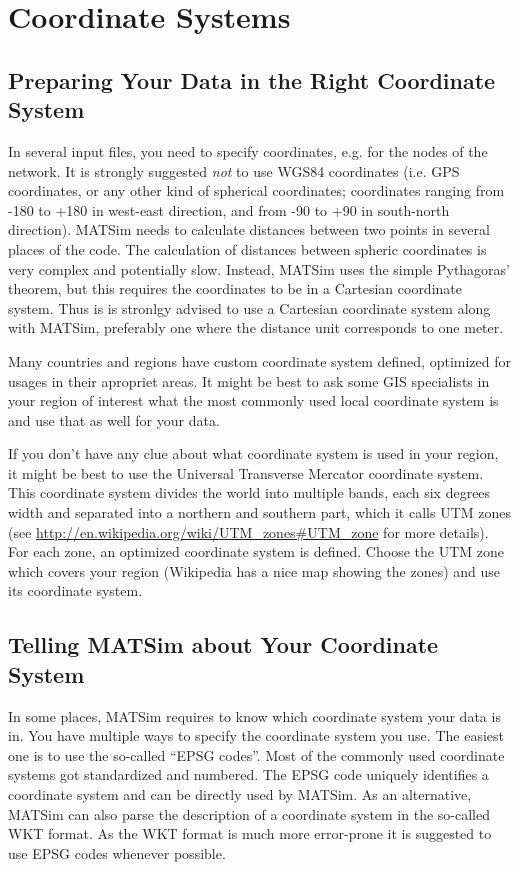 \section{Coordinate Systems}
\label{sec:BuildingScenarios:CoordinateSystems}

\subsection{Preparing Your Data in the Right Coordinate System}

In several input files, you need to specify coordinates, e.g. for the nodes of
the network. It is strongly suggested \emph{not} to use WGS84 coordinates (i.e.
GPS coordinates, or any other kind of spherical coordinates; coordinates ranging
from -180 to +180 in west-east direction, and from -90 to +90 in south-north
direction). MATSim needs to calculate distances between two points in several
places of the code. The calculation of distances between spheric coordinates is
very complex and potentially slow. Instead, MATSim uses the simple Pythagoras'
theorem, but this requires the coordinates to be in a Cartesian coordinate
system. Thus is is stronlgy advised to use a Cartesian coordinate system along
with MATSim, preferably one where the distance unit corresponds to one meter.

Many countries and regions have custom coordinate system defined, optimized for
usages in their apropriet areas. It might be best to ask some GIS specialists in
your region of interest what the most commonly used local coordinate system is
and use that as well for your data. 

If you don't have any clue about what coordinate system is used in your region,
it might be best to use the Universal Transverse Mercator coordinate system.
This coordinate system divides the world into multiple bands, each six degrees
width and separated into a northern and southern part, which it calls UTM zones
(see \url{http://en.wikipedia.org/wiki/UTM_zones#UTM_zone} for more details).
For each zone, an optimized coordinate system is defined. Choose the UTM zone
which covers your region (Wikipedia has a nice map showing the zones) and use
its coordinate system.

\subsection{Telling MATSim about Your Coordinate System}

In some places, MATSim requires to know which coordinate system your data is in.
You have multiple ways to specify the coordinate system you use. The easiest one
is to use the so-called ``EPSG codes''. Most of the commonly used coordinate
systems got standardized and numbered. The EPSG code uniquely identifies a
coordinate system and can be directly used by MATSim. As an alternative, MATSim
can also parse the description of a coordinate system in the so-called WKT
format. As the WKT format is much more error-prone it is suggested to use EPSG
codes whenever possible.

